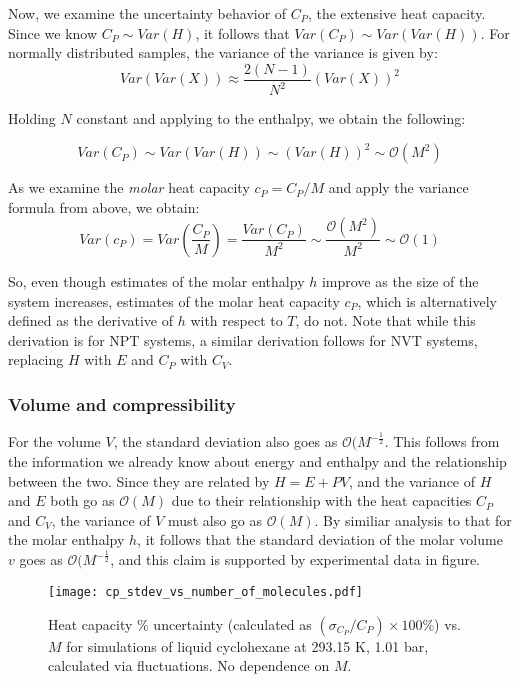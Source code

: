 \documentclass[aps,pre,twocolumn,nofootinbib,superscriptaddress,linenumbers,10pt, draft,tightenlines]{revtex4-1}
\begin{document}
Now, we examine the uncertainty behavior of $C_P$, the extensive heat capacity.  Since we know $C_P \sim Var(H)$, it follows that $ Var(C_P) \sim Var(Var(H)) $.  For normally distributed samples, the variance of the variance is given by:
\begin{equation}
Var(Var(X)) \approx \frac{2(N-1)}{N^2} (Var(X))^2
\end{equation}

Holding $N$ constant and applying to the enthalpy, we obtain the following:

\begin{equation}
Var(C_P) \sim Var(Var(H)) \sim (Var(H))^2 \sim \mathcal{O}(M^2)
\end{equation}

As we examine the \emph{molar} heat capacity $c_P=C_P/M$ and apply the variance formula from above, we obtain:
\begin{equation}
Var(c_P) = Var(\frac{C_P}{M}) = \frac{Var(C_P)}{M^2}  \sim \frac{\mathcal{O}(M^2)}{M^2} \sim \mathcal{O}(1)
\end{equation}

So, even though estimates of the molar enthalpy $h$ improve as the size of the system increases, estimates of the molar heat capacity $c_P$, which is alternatively defined as the derivative of $h$ with respect to $T$, do not.  Note that while this derivation is for NPT systems, a similar derivation follows for NVT systems, replacing $H$ with $E$ and $C_P$ with $C_V$.

\subsubsection{Volume and compressibility}

For the volume $V$, the standard deviation also goes as $\mathcal{O}(M^{-\frac{1}{2}}$.  This follows from the information we already know about energy and enthalpy and the relationship between the two.  Since they are related by $H=E+PV$, and the variance of $H$ and $E$ both go as $\mathcal{O}(M)$ due to their relationship with the heat capacities $C_P$ and $C_V$, the variance of $V$ must also go as $\mathcal{O}(M)$.  By similiar analysis to that for the molar enthalpy $h$, it follows that the standard deviation of the molar volume $v$ goes as $\mathcal{O}(M^{-\frac{1}{2}}$, and this claim is supported by experimental data in figure. %
\begin{figure}[H]
\texttt{[image: cp\_stdev\_vs\_number\_of\_molecules.pdf]}
\caption{Heat capacity \% uncertainty (calculated as $(\sigma_{C_P}/C_P) \times 100 \%$) vs. $M$ for simulations of liquid cyclohexane at 293.15 K, 1.01 bar, calculated via fluctuations. No dependence on $M$.}
\end{figure}
\end{document}
